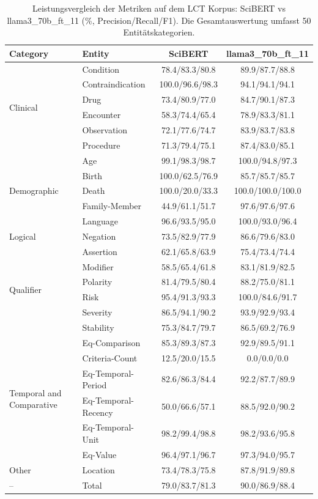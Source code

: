 
\begin{table}[htbp]
\centering
\begin{tabular}{llcc}
\toprule
\textbf{Category} & \textbf{Entity} & \textbf{SciBERT} & \textbf{llama3_70b_ft_11} \\
\midrule
\multirow{6}{*}{Clinical} & Condition & 78.4/83.3/80.8 & 89.9/87.7/88.8 \\
 & Contraindication & 100.0/96.6/98.3 & 94.1/94.1/94.1 \\
 & Drug & 73.4/80.9/77.0 & 84.7/90.1/87.3 \\
 & Encounter & 58.3/74.4/65.4 & 78.9/83.3/81.1 \\
 & Observation & 72.1/77.6/74.7 & 83.9/83.7/83.8 \\
 & Procedure & 71.3/79.4/75.1 & 87.4/83.0/85.1 \\
\midrule
\multirow{5}{*}{Demographic} & Age & 99.1/98.3/98.7 & 100.0/94.8/97.3 \\
 & Birth & 100.0/62.5/76.9 & 85.7/85.7/85.7 \\
 & Death & 100.0/20.0/33.3 & 100.0/100.0/100.0 \\
 & Family-Member & 44.9/61.1/51.7 & 97.6/97.6/97.6 \\
 & Language & 96.6/93.5/95.0 & 100.0/93.0/96.4 \\
\midrule
Logical & Negation & 73.5/82.9/77.9 & 86.6/79.6/83.0 \\
\midrule
\multirow{6}{*}{Qualifier} & Assertion & 62.1/65.8/63.9 & 75.4/73.4/74.4 \\
 & Modifier & 58.5/65.4/61.8 & 83.1/81.9/82.5 \\
 & Polarity & 81.4/79.5/80.4 & 88.2/75.0/81.1 \\
 & Risk & 95.4/91.3/93.3 & 100.0/84.6/91.7 \\
 & Severity & 86.5/94.1/90.2 & 93.9/92.9/93.4 \\
 & Stability & 75.3/84.7/79.7 & 86.5/69.2/76.9 \\
\midrule
\multirow{6}{*}{Temporal and Comparative} & Eq-Comparison & 85.3/89.3/87.3 & 92.9/89.5/91.1 \\
 & Criteria-Count & 12.5/20.0/15.5 & 0.0/0.0/0.0 \\
 & Eq-Temporal-Period & 82.6/86.3/84.4 & 92.2/87.7/89.9 \\
 & Eq-Temporal-Recency & 50.0/66.6/57.1 & 88.5/92.0/90.2 \\
 & Eq-Temporal-Unit & 98.2/99.4/98.8 & 98.2/93.6/95.8 \\
 & Eq-Value & 96.4/97.1/96.7 & 97.3/94.0/95.7 \\
\midrule
Other & Location & 73.4/78.3/75.8 & 87.8/91.9/89.8 \\
\midrule
-- & Total & 79.0/83.7/81.3 & 90.0/86.9/88.4 \\
\bottomrule
\end{tabular}
\caption{Leistungsvergleich der Metriken auf dem LCT Korpus: SciBERT vs llama3_70b_ft_11 (\%, Precision/Recall/F1). Die Gesamtauswertung umfasst 50 Entitätskategorien.}
\label{tab:metrics_comparison}
\end{table}
    